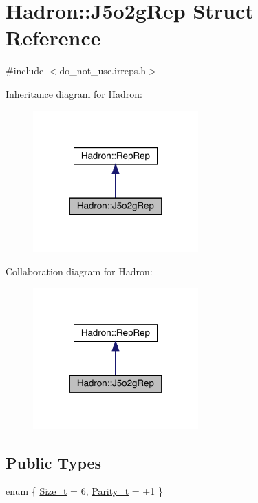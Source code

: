 \hypertarget{structHadron_1_1J5o2gRep}{}\section{Hadron\+:\+:J5o2g\+Rep Struct Reference}
\label{structHadron_1_1J5o2gRep}


{\ttfamily \#include $<$do\+\_\+not\+\_\+use.\+irreps.\+h$>$}



Inheritance diagram for Hadron\+:\nopagebreak
\begin{figure}[H]
\begin{center}
\leavevmode
\includegraphics[width=180pt]{d3/d61/structHadron_1_1J5o2gRep__inherit__graph}
\end{center}
\end{figure}


Collaboration diagram for Hadron\+:\nopagebreak
\begin{figure}[H]
\begin{center}
\leavevmode
\includegraphics[width=180pt]{d2/d52/structHadron_1_1J5o2gRep__coll__graph}
\end{center}
\end{figure}
\subsection*{Public Types}
\begin{DoxyCompactItemize}
\item 
enum \{ \mbox{\hyperlink{structHadron_1_1J5o2gRep_a565425eaf70ba5d54f8fedbd90dde080a944a48199d47b08c33a898b737541fda}{Size\+\_\+t}} = 6, 
\mbox{\hyperlink{structHadron_1_1J5o2gRep_a565425eaf70ba5d54f8fedbd90dde080affa1bc263af4182e049434b5edea9fa7}{Parity\+\_\+t}} = +1
 \}
\end{DoxyCompactItemize}
